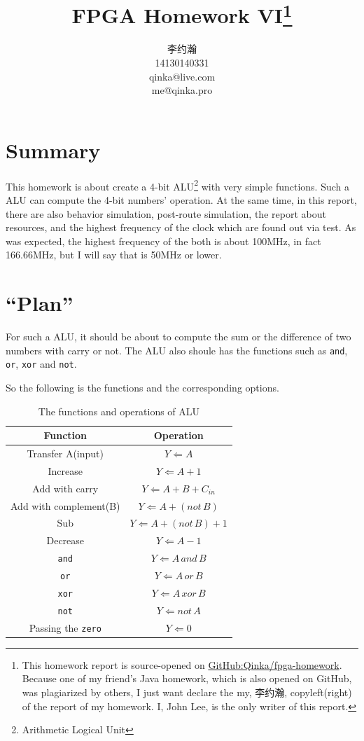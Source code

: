 \documentclass{article}
\title{FPGA Homework VI\thanks{%
        This homework report is source-opened on
        \href{https://github.com/Qinka/fgpa-homework}{GitHub:Qinka/fpga-homework}.
        Because one of my friend's Java homework, which is also opened on GitHub, was plagiarized by others, I just want declare the my, 李约瀚, copyleft(right) of the report of my homework.
        I, John Lee, is the only writer of this report.
        }}
\author{李约瀚 \\ 14130140331 \\ qinka@live.com \\ me@qinka.pro}
\begin{document}
    \maketitle
    \newpage
    \tableofcontents
    \newpage
    
    \section{Summary}
    \label{sec:summary}
    
    This homework is about create a 4-bit ALU\footnote{Arithmetic Logical Unit} with very simple functions.
    Such a ALU can compute the 4-bit numbers' operation.
    At the same time, in this report, there are also behavior simulation, post-route simulation, the report about resources,
    and the highest frequency of the clock which are found out via test.
    As was expected, the highest frequency of the both is about 100MHz, in fact 166.66MHz, but I will say that is 50MHz or lower.
    
    \section{``Plan''}
    \label{sec:plan}
    
    For such a ALU, it should be about to compute the sum or the difference of two numbers with carry or not.
    The ALU also shoule has the functions such as \verb|and|, \verb|or|, \verb|xor| and \verb|not|.
    
    So the following is the functions and the corresponding options.
    
    \begin{table}[h!]
        \centering
        \begin{tabular}{|c|c|}
            \hline Function & Operation \\ 
            \hline Transfer A(input) & $Y \Leftarrow A$ \\ 
            \hline Increase & $ Y \Leftarrow A + 1$ \\ 
            \hline Add with carry & $Y \Leftarrow A + B + C_{in}$ \\ 
            \hline Add with complement(B)  & $Y \Leftarrow A + (not\,B)$ \\ 
            \hline Sub & $Y \Leftarrow A +(not\,B) + 1$ \\
            \hline Decrease & $ Y \Leftarrow A - 1$ \\
            \hline \verb|and| & $ Y \Leftarrow A\,and\,B $ \\
            \hline \verb|or|  & $ Y \Leftarrow A\,or\,B $ \\
            \hline \verb|xor| & $ Y \Leftarrow A\,xor\,B $ \\
            \hline \verb|not| & $ Y \Leftarrow not\,A$ \\
            \hline Passing the \verb|zero| & $ Y \Leftarrow 0 $\\
            \hline
        \end{tabular} 
        \caption{The functions and operations of ALU}
        \label{tab:alu:fno}
    \end{table}
    
\end{document}

